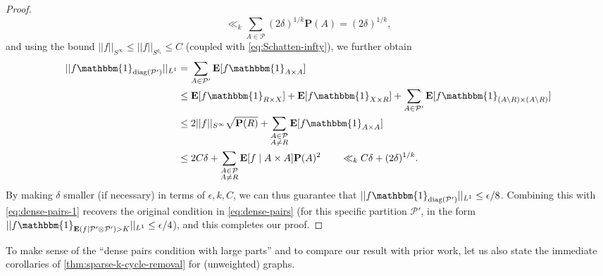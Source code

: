 \documentclass[reqno,11pt]{amsart}
\theoremstyle{definition}
\theoremstyle{remark}
\numberwithin{equation}{section}
\renewcommand{\P}{\mathbf{P}}
\newcommand{\E}{\mathbf{E}}
\newcommand{\mP}{\mathcal{P}}
\newcommand{\one}{\mathbbm{1}}
\newcommand{\diag}{\textnormal{diag}}
\begin{document}
\begin{proof}
\[    \ll_k 
    \sum_{A \in \mP} (2\delta)^{1/k} \P(A)
    = (2\delta)^{1/k},
\]
and using the bound $||f||_{S^\infty} \le ||f||_{S^{q_1}} \le C$ (coupled with \cref{eq:Schatten-infty}), we further obtain
\[
\begin{aligned}
    ||f \one_{\diag(\mP')}||_{L^1} &= \sum_{A \in \mP'} \E[f \one_{A \times A}]
    \\
    &\le 
    \E[f \one_{R \times X}] + \E[f \one_{X \times R}]
    +
    \sum_{A \in \mP'} \E[f \one_{(A \setminus R) \times (A \setminus R)}]
    \\
    &\le 
    2||f||_{S^\infty}\sqrt{\P(R)}
    +
    \sum_{\substack{A \in \mP \\ A \neq R}} \E[f \one_{A \times A}]
    \\
    &\le 
    2C \delta +
    \sum_{\substack{A \in \mP \\ A \neq R}} \E[f \mid A \times A] \P(A)^2
    \qquad 
    \ll_k 
    C\delta + (2\delta)^{1/k}.
\end{aligned}
\]
By making $\delta$ smaller (if necessary) in terms of $\epsilon, k, C$, we can thus guarantee that $||f \one_{\diag(\mP')}||_{L^1} \le \epsilon/8$. Combining this with \cref{eq:dense-pairs-1} recovers the original condition in \cref{eq:dense-pairs} (for this specific partition $\mP'$, in the form $||f\one_{\E(f \mid \mP' \otimes \mP') > K}||_{L^1} \le \epsilon/4$), and this completes our proof.
\end{proof}

To make sense of the ``dense pairs condition with large parts'' and to compare our result with prior work, let us also state the immediate corollaries of \cref{thm:sparse-k-cycle-removal} for (unweighted) graphs.
\end{document}
